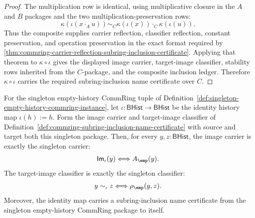 \begin{proof}
The multiplication row is identical, using multiplicative closure in the $A$ and $B$ packages and the two multiplication-preservation rows:
$$
\kappa(\iota(x\cdot_Au))\sim_C\kappa(\iota(x))\cdot_C\kappa(\iota(u)).
$$
Thus the composite supplies carrier reflection, classifier reflection, constant preservation, and operation preservation in the exact format required by \autoref{thm:commring-carrier-reflection-subring-inclusion-certificate}. Applying that theorem to $\kappa\circ\iota$ gives the displayed image carrier, target-image classifier, stability rows inherited from the $C$-package, and the composite inclusion ledger. Therefore $\kappa\circ\iota$ carries the required subring-inclusion name certificate over $C$.
\end{proof}

\begin{theorem}
\label{thm:commring-singleton-empty-identity-subring-inclusion}
For the singleton empty-history CommRing tuple of
Definition~\ref{def:singleton-empty-history-commring-instance}, let
$\iota:\mathsf{BHist}\to\mathsf{BHist}$ be the identity history map
$\iota(h):=h$. Form the image carrier and target-image classifier of
Definition~\ref{def:commring-subring-inclusion-name-certificate} with source
and target both this singleton package. Then, for every $y,z:\mathsf{BHist}$,
the image carrier is exactly the singleton carrier:
$$
\mathsf{Im}_{\iota}(y)\Longleftrightarrow A_{\emp}(y).
$$
The target-image classifier is exactly the singleton classifier:
$$
y\sim_{\iota}z\Longleftrightarrow \rho_{\emp}(y,z).
$$
Moreover, the identity map carries a subring-inclusion name certificate from
the singleton empty-history CommRing package to itself.
\end{theorem}

